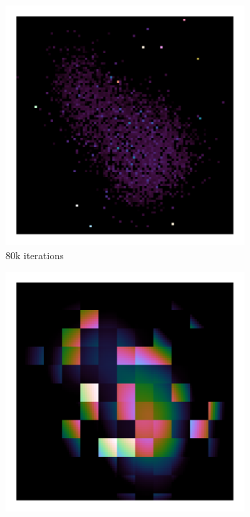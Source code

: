 \begin{figure}[h]
\begin{subfigure}[b]{0.245\linewidth}
		\includegraphics[width=1.00\linewidth, clip, trim= 0.25in 0.25in 0.25in 0.25in]{./chapters/05.pcdm/randomProblem/random_10k_block1.png}
		\caption{80k iterations}
		\label{pcdm:adaption:randomProblem:block12}
	\end{subfigure}
		\begin{subfigure}[b]{0.245\linewidth}
		\includegraphics[width=1.00\linewidth, clip, trim= 0.25in 0.25in 0.25in 0.25in]{./chapters/05.pcdm/randomProblem/random_1k_block8.png}

\end{subfigure}
\end{figure}
